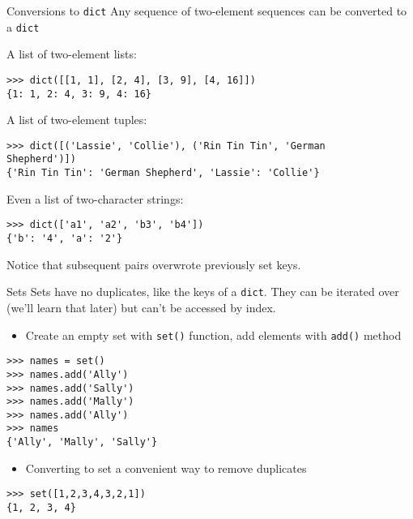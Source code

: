 \documentclass[smaller]{beamer}
\begin{document}
\begin{frame}[label={sec:org6d94bd5},fragile]{Conversions to \texttt{dict}}
 Any sequence of two-element sequences can be converted to a \texttt{dict}

A list of two-element lists:

\lstset{language=Python,label= ,caption= ,captionpos=b,numbers=none}
\begin{lstlisting}
>>> dict([[1, 1], [2, 4], [3, 9], [4, 16]])
{1: 1, 2: 4, 3: 9, 4: 16}
\end{lstlisting}

A list of two-element tuples:


\lstset{language=Python,label= ,caption= ,captionpos=b,numbers=none}
\begin{lstlisting}
>>> dict([('Lassie', 'Collie'), ('Rin Tin Tin', 'German
Shepherd')])
{'Rin Tin Tin': 'German Shepherd', 'Lassie': 'Collie'}
\end{lstlisting}

Even a list of two-character strings:

\lstset{language=Python,label= ,caption= ,captionpos=b,numbers=none}
\begin{lstlisting}
>>> dict(['a1', 'a2', 'b3', 'b4'])
{'b': '4', 'a': '2'}
\end{lstlisting}

Notice that subsequent pairs overwrote previously set keys.
\end{frame}

\begin{frame}[label={sec:orgdf705f6},fragile]{Sets}
 Sets have no duplicates, like the keys of a \texttt{dict}. They can be iterated
over (we'll learn that later) but can't be accessed by index.

\begin{itemize}
\item Create an empty set with \texttt{set()} function, add elements with \texttt{add()} method
\end{itemize}

\lstset{language=Python,label= ,caption= ,captionpos=b,numbers=none}
\begin{lstlisting}
>>> names = set()
>>> names.add('Ally')
>>> names.add('Sally')
>>> names.add('Mally')
>>> names.add('Ally')
>>> names
{'Ally', 'Mally', 'Sally'}
\end{lstlisting}

\begin{itemize}
\item Converting to set a convenient way to remove duplicates
\end{itemize}

\lstset{language=Python,label= ,caption= ,captionpos=b,numbers=none}
\begin{lstlisting}
>>> set([1,2,3,4,3,2,1])
{1, 2, 3, 4}
\end{lstlisting}
\end{frame}
\end{document}

